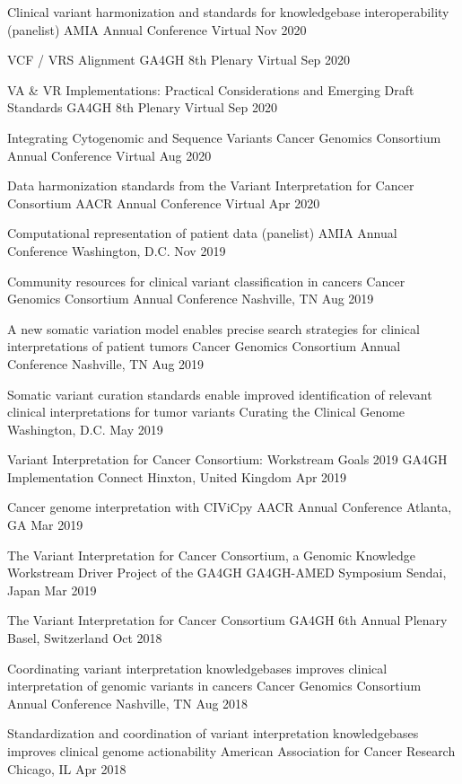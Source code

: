 \oral
{Clinical variant harmonization and standards for knowledgebase interoperability (panelist)}
{AMIA Annual Conference}
{Virtual}
{Nov 2020}

\invited
{VCF / VRS Alignment}
{GA4GH 8th Plenary}
{Virtual}
{Sep 2020}

\invited
{VA \& VR Implementations: Practical Considerations and Emerging Draft Standards}
{GA4GH 8th Plenary}
{Virtual}
{Sep 2020}

\oral
{Integrating Cytogenomic and Sequence Variants}
{Cancer Genomics Consortium Annual Conference}
{Virtual}
{Aug 2020}

\oral
{Data harmonization standards from the Variant Interpretation for Cancer Consortium}
{AACR Annual Conference}
{Virtual}
{Apr 2020}

\invited
{Computational representation of patient data (panelist)}
{AMIA Annual Conference}
{Washington, D.C.}
{Nov 2019}

\invited
{Community resources for clinical variant classification in cancers}
{Cancer Genomics Consortium Annual Conference}
{Nashville, TN}
{Aug 2019}

\oral
{A new somatic variation model enables precise search strategies for clinical interpretations of patient tumors}
{Cancer Genomics Consortium Annual Conference}
{Nashville, TN}
{Aug 2019}

\oral
{Somatic variant curation standards enable improved identification of relevant clinical interpretations for tumor variants}
{Curating the Clinical Genome}
{Washington, D.C.}
{May 2019}

\invited
{Variant Interpretation for Cancer Consortium: Workstream Goals 2019}
{GA4GH Implementation Connect}
{Hinxton, United Kingdom}
{Apr 2019}

\poster
{Cancer genome interpretation with CIViCpy}
{AACR Annual Conference}
{Atlanta, GA}
{Mar 2019}

\invited
{The Variant Interpretation for Cancer Consortium, a Genomic Knowledge Workstream Driver Project of the GA4GH}
{GA4GH-AMED Symposium}
{Sendai, Japan}
{Mar 2019}

\invited
{The Variant Interpretation for Cancer Consortium}
{GA4GH 6th Annual Plenary}
{Basel, Switzerland}
{Oct 2018}

\oral
{Coordinating variant interpretation knowledgebases improves clinical interpretation of genomic variants in cancers}
{Cancer Genomics Consortium Annual Conference}
{Nashville, TN}
{Aug 2018}

\poster
{Standardization and coordination of variant interpretation knowledgebases improves clinical genome actionability}
{American Association for Cancer Research}
{Chicago, IL}
{Apr 2018}

